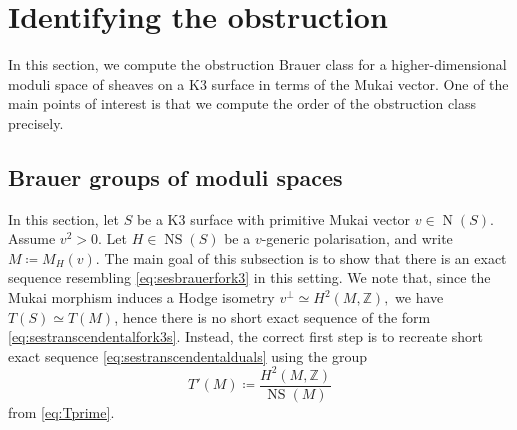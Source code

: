 \documentclass[11pt,twoside]{amsart}
\numberwithin{equation}{section}
\theoremstyle{definition}
\theoremstyle{plain}
\newcommand{\Z}{\ensuremath{\mathbb{Z}}}
\def\NS{\operatorname{NS}}
\def\N{\operatorname{N}}
\begin{document}
\section{Identifying the obstruction}
In this section, we compute the obstruction Brauer class for a higher-dimensional moduli space of sheaves on a K3 surface in terms of the Mukai vector. One of the main points of interest is that we compute the order of the obstruction class precisely. 

\subsection{Brauer groups of moduli spaces}
In this section, let $S$ be a K3 surface with primitive Mukai vector $v\in \N(S)$. Assume $v^2 >0$. Let $H\in \NS(S)$ be a $v$-generic polarisation, and write $M\coloneqq M_H(v)$. The main goal of this subsection is to show that there is an exact sequence resembling \eqref{eq:sesbrauerfork3} in this setting. We note that, since the Mukai morphism induces a Hodge isometry $v^\perp\simeq H^2(M,\Z),$ we have $T(S)\simeq T(M)$, hence there is no short exact sequence of the form \eqref{eq:sestranscendentalfork3s}. Instead, the correct first step is to recreate short exact sequence \eqref{eq:sestranscendentalduals} using the group $$T'(M)\coloneqq \frac{H^2(M,\Z)}{\NS(M)}$$ from \eqref{eq:Tprime}.
\end{document}
